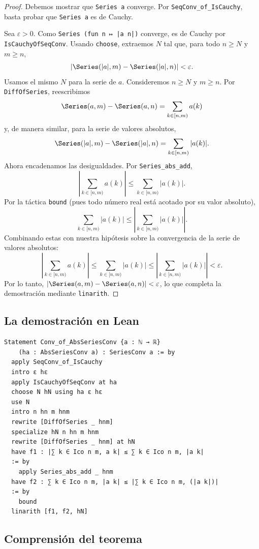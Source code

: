 \begin{proof}
Debemos mostrar que \texttt{Series a} converge. Por \texttt{SeqConv\_of\_IsCauchy}, basta probar que \texttt{Series a} es de Cauchy.

Sea $\varepsilon > 0$. Como \texttt{Series (fun n ↦ |a n|)} converge, es de Cauchy por \texttt{IsCauchyOfSeqConv}. Usando \texttt{choose}, extraemos $N$ tal que, para todo $n \ge N$ y $m \ge n$,
\[
  |\Series(|a|, m) - \Series(|a|, n)| < \varepsilon .
\]
Usamos el mismo $N$ para la serie de $a$. Consideremos $n \ge N$ y $m \ge n$. Por \texttt{DiffOfSeries}, reescribimos
\[
  \Series(a, m) - \Series(a, n) = \sum_{k \in [n,m)} a(k)
\]
y, de manera similar, para la serie de valores absolutos,
\[
  \Series(|a|, m) - \Series(|a|, n) = \sum_{k \in [n,m)} |a(k)| .
\]
Ahora encadenamos las desigualdades. Por \texttt{Series\_abs\_add},
\[
  \left| \sum_{k \in [n,m)} a(k) \right| \le \sum_{k \in [n,m)} |a(k)| .
\]
Por la táctica \texttt{bound} (pues todo número real está acotado por su valor absoluto),
\[
  \sum_{k \in [n,m)} |a(k)| \le \left| \sum_{k \in [n,m)} |a(k)| \right| .
\]
Combinando estas con nuestra hipótesis sobre la convergencia de la serie de valores absolutos:
\[
  \left| \sum_{k \in [n,m)} a(k) \right| \le \sum_{k \in [n,m)} |a(k)| \le \left| \sum_{k \in [n,m)} |a(k)| \right| < \varepsilon .
\]
Por lo tanto, $|\Series(a, m) - \Series(a, n)| < \varepsilon$, lo que completa la demostración mediante \texttt{linarith}.
\end{proof}

\subsection{La demostración en Lean}

\begin{verbatim}
Statement Conv_of_AbsSeriesConv {a : ℕ → ℝ}
    (ha : AbsSeriesConv a) : SeriesConv a := by
  apply SeqConv_of_IsCauchy
  intro ε hε
  apply IsCauchyOfSeqConv at ha
  choose N hN using ha ε hε
  use N
  intro n hn m hnm
  rewrite [DiffOfSeries _ hnm]
  specialize hN n hn m hnm
  rewrite [DiffOfSeries _ hnm] at hN
  have f1 : |∑ k ∈ Ico n m, a k| ≤ ∑ k ∈ Ico n m, |a k|
  := by
    apply Series_abs_add _ hnm
  have f2 : ∑ k ∈ Ico n m, |a k| ≤ |∑ k ∈ Ico n m, (|a k|)|
  := by
    bound
  linarith [f1, f2, hN]
\end{verbatim}

\subsection{Comprensión del teorema}

